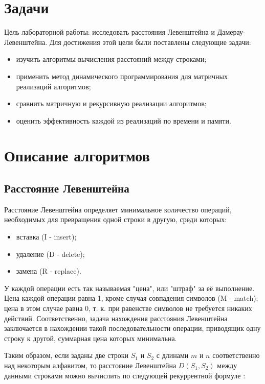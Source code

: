 \documentclass[12pt, a4paper]{report}
\begin{document}
	\section{Задачи}
	Цель лабораторной работы: исследовать расстояния Левенштейна и Дамерау-Левенштейна. Для достижения этой цели были поставлены следующие задачи: 
	\begin{itemize}
		\item изучить алгоритмы вычисления расстояний между строками;
		\item применить метод динамического программирования для матричных реализаций алгоритмов;
		\item сравнить матричную и рекурсивную реализации алгоритмов;
		\item оценить эффективность каждой из реализаций по времени и памяти.
	\end{itemize}

	\section{Описание алгоритмов}
	\subsection{Расстояние Левенштейна}
	Расстояние Левенштейна определяет минимальное количество операций, необходимых для превращения одной строки в другую, среди которых:
	\begin{itemize}
		\item вставка (I - insert);
		\item удаление (D - delete);
		\item замена (R - replace).
	\end{itemize}
	У каждой операции есть так называемая "цена", или "штраф" за её выполнение. Цена каждой операции равна 1, кроме случая совпадения символов (M - match); цена в этом случае равна 0, т. к. при равенстве символов не требуется никаких действий. Соответственно, задача нахождения расстояния Левенштейна заключается в нахождении такой последовательности операции, приводящик одну строку к другой, суммарная цена которых минимальна.

	Таким образом, если заданы две строки $S_{1}$ и $S_{2}$ с длинами $m$ и $n$ соответственно над некоторым алфавитом, то расстояние Левенштейна $D(S_{1}, S_{2})$ между данными строками можно вычислить по следующей рекуррентной формуле \cite{recurs}:
\end{document}
